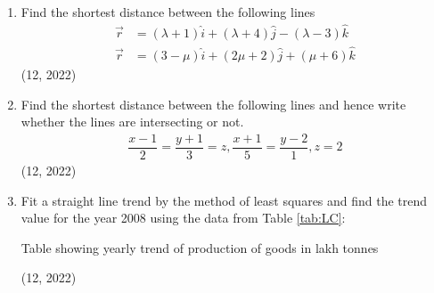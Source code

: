 \begin{enumerate}[label=\thesubsection.\arabic*,ref=\thesubsection.\theenumi]
\item Find the shortest distance between the following lines
	\begin{align}
		\vec{r}&=(\lambda+1)\hat{i}+(\lambda+4)\hat{j}-(\lambda-3)\hat{k}\\
		\vec{r}&=(3-\mu)\hat{i}+(2\mu+2)\hat{j}+(\mu+6)\hat{k}
	\end{align}
\hfill (12, 2022)

\item Find the shortest distance between the following lines and hence write whether the lines are intersecting or not.
	\begin{align}
		\dfrac{x-1}{2}=\dfrac{y+1}{3}=z, \dfrac{x+1}{5}=\dfrac{y-2}{1}, z=2
	\end{align}
\hfill (12, 2022)
\item Fit a straight line trend by the method of least squares and find the trend value for the year 2008 using the data from Table \ref{tab:LC}:
	\begin{table}[H]
		\caption{Table showing yearly trend of production of goods in lakh tonnes \label{tab:LC}}
		
	\end{table}
\hfill (12, 2022)

\end{enumerate}
